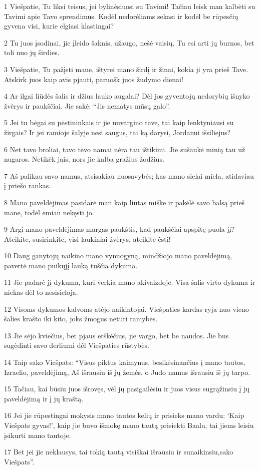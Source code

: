 \par 1 Viešpatie, Tu liksi teisus, jei bylinėsiuosi su Tavimi! Tačiau leisk man kalbėti su Tavimi apie Tavo sprendimus. Kodėl nedorėliams sekasi ir kodėl be rūpesčių gyvena visi, kurie elgiasi klastingai? 
\par 2 Tu juos įsodinai, jie įleido šaknis, užaugo, nešė vaisių. Tu esi arti jų burnos, bet toli nuo jų širdies. 
\par 3 Viešpatie, Tu pažįsti mane, ištyrei mano širdį ir žinai, kokia ji yra prieš Tave. Atskirk juos kaip avis pjauti, paruošk juos žudymo dienai! 
\par 4 Ar ilgai liūdės šalis ir džius lauko augalai? Dėl jos gyventojų nedorybių išnyko žvėrys ir paukščiai. Jie sakė: “Jis nematys mūsų galo”. 
\par 5 Jei tu bėgai su pėstininkais ir jie nuvargino tave, tai kaip lenktyniausi su žirgais? Ir jei ramioje šalyje nesi saugus, tai ką darysi, Jordanui išsiliejus? 
\par 6 Net tavo broliai, tavo tėvo namai nėra tau ištikimi. Jie sušaukė minią tau už nugaros. Netikėk jais, nors jie kalba gražius žodžius. 
\par 7 Aš palikau savo namus, atsisakiau nuosavybės; kas mano sielai miela, atidaviau į priešo rankas. 
\par 8 Mano paveldėjimas pasidarė man kaip liūtas miške ir pakėlė savo balsą prieš mane, todėl ėmiau nekęsti jo. 
\par 9 Argi mano paveldėjimas margas paukštis, kad paukščiai apspitę puola jį? Ateikite, susirinkite, visi laukiniai žvėrys, ateikite ėsti! 
\par 10 Daug ganytojų naikino mano vynuogyną, mindžiojo mano paveldėjimą, pavertė mano puikųjį lauką tuščia dykuma. 
\par 11 Jie padarė jį dykuma, kuri verkia mano akivaizdoje. Visa šalis virto dykuma ir niekas dėl to nesisieloja. 
\par 12 Visoms dykumos kalvoms atėjo naikintojai. Viešpaties kardas ryja nuo vieno šalies krašto iki kito, joks žmogus neturi ramybės. 
\par 13 Jie sėjo kviečius, bet pjaus erškėčius, jie vargo, bet be naudos. Jie bus sugėdinti savo derliumi dėl Viešpaties rūstybės. 
\par 14 Taip sako Viešpats: “Visus piktus kaimynus, besikėsinančius į mano tautos, Izraelio, paveldėjimą, Aš išrausiu iš jų žemės, o Judo namus išrausiu iš jų tarpo. 
\par 15 Tačiau, kai būsiu juos išrovęs, vėl jų pasigailėsiu ir juos visus sugrąžinsiu į jų paveldėjimą ir į jų kraštą. 
\par 16 Jei jie rūpestingai mokysis mano tautos kelių ir prisieks mano vardu: ‘Kaip Viešpats gyvas!’, kaip jie buvo išmokę mano tautą prisiekti Baalu, tai jiems leisiu įsikurti mano tautoje. 
\par 17 Bet jei jie neklausys, tai tokią tautą visiškai išrausiu ir sunaikinsiu,­sako Viešpats”.



